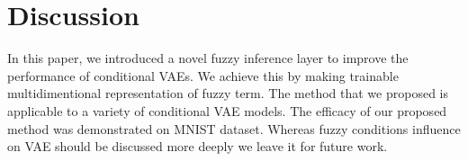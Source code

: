 \documentclass[runningheads]{llncs}
\begin{document}
\section{Discussion}

In this paper, we introduced a novel fuzzy inference layer to improve the performance of conditional VAEs. 
We achieve this by making trainable multidimentional representation of fuzzy term.
The method that we proposed is applicable to a variety of conditional VAE models. 
The efficacy of our proposed method was demonstrated on MNIST dataset. 
Whereas fuzzy conditions influence on VAE should be discussed more deeply we leave it for future work. 



\end{document}

